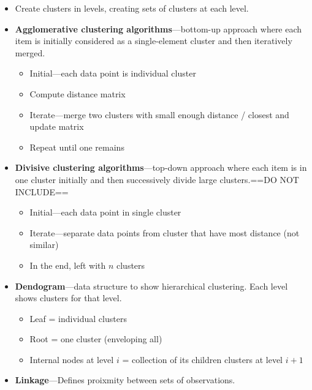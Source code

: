 \begin{multicols}{2}
\begin{itemize}
  \begin{itemize}
    \item
    Create clusters in levels, creating sets of clusters at each level.
  \item
    \textbf{Agglomerative clustering algorithms}---bottom-up approach
    where each item is initially considered as a single-element cluster
    and then iteratively merged.

    \begin{itemize}
        \item
      Initial---each data point is individual cluster
    \item
      Compute distance matrix
    \item
      Iterate---merge two clusters with small enough distance / closest
      and update matrix
    \item
      Repeat until one remains
    \end{itemize}
  \item
    \textbf{Divisive clustering algorithms}---top-down approach where
    each item is in one cluster initially and then successively divide
    large clusters.==DO NOT INCLUDE==

    \begin{itemize}
        \item
      Initial---each data point in single cluster
    \item
      Iterate---separate data points from cluster that have most
      distance (not similar)
    \item
      In the end, left with \(n\) clusters
    \end{itemize}
  \item
    \textbf{Dendogram}---data structure to show hierarchical clustering.
    Each level shows clusters for that level.

    \begin{itemize}
        \item
      Leaf = individual clusters
    \item
      Root = one cluster (enveloping all)
    \item
      Internal nodes at level \(i\) = collection of its children
      clusters at level \(i+1\)
    \end{itemize}
  \item
    \textbf{Linkage}---Defines proixmity between sets of observations.


\end{itemize}
\end{itemize}
\end{multicols}
